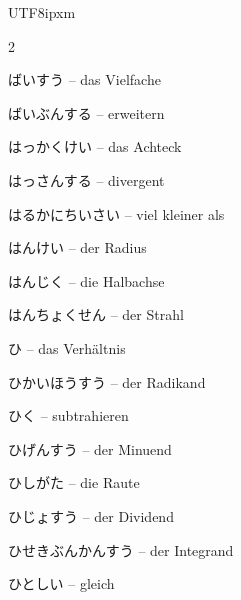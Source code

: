 \begin{CJK}{UTF8}{ipxm}
\begin{multicols}{2}
\par\nopagebreak
{} {\footnotesize\color{black!70}ばいすう} -- das Vielfache\dotfill\hyperref[e:55]{\pageref*{e:55}}\par
{} {\footnotesize\color{black!70}ばいぶんする} -- erweitern\dotfill\hyperref[e:38]{\pageref*{e:38}}\par
{} {\footnotesize\color{black!70}はっかくけい} -- das Achteck\dotfill\hyperref[e:207]{\pageref*{e:207}}\par
{} {\footnotesize\color{black!70}はっさんする} -- divergent\dotfill\hyperref[e:263]{\pageref*{e:263}}\par
{} {\footnotesize\color{black!70}はるかにちいさい} -- viel kleiner als\dotfill\hyperref[e:67]{\pageref*{e:67}}\par
{} {\footnotesize\color{black!70}はんけい} -- der Radius\dotfill\hyperref[e:213]{\pageref*{e:213}}\par
{} {\footnotesize\color{black!70}はんじく} -- die Halbachse\dotfill\hyperref[e:317]{\pageref*{e:317}}\par
{} {\footnotesize\color{black!70}はんちょくせん} -- der Strahl\dotfill\hyperref[e:149]{\pageref*{e:149}}\par
{} {\footnotesize\color{black!70}ひ} -- das Verhältnis\dotfill\hyperref[e:40]{\pageref*{e:40}}\par
{} {\footnotesize\color{black!70}ひかいほうすう} -- der Radikand\dotfill\hyperref[e:48]{\pageref*{e:48}}\par
{} {\footnotesize\color{black!70}ひく} -- subtrahieren\dotfill\hyperref[e:17]{\pageref*{e:17}}\par
{} {\footnotesize\color{black!70}ひげんすう} -- der Minuend\dotfill\hyperref[e:19]{\pageref*{e:19}}\par
{} {\footnotesize\color{black!70}ひしがた} -- die Raute\dotfill\hyperref[e:201]{\pageref*{e:201}}\par
{} {\footnotesize\color{black!70}ひじょすう} -- der Dividend\dotfill\hyperref[e:26]{\pageref*{e:26}}\par
{} {\footnotesize\color{black!70}ひせきぶんかんすう} -- der Integrand\dotfill\hyperref[e:290]{\pageref*{e:290}}\par
{} {\footnotesize\color{black!70}ひとしい} -- gleich\dotfill\hyperref[e:60]{\pageref*{e:60}}\par

\end{multicols}
\end{CJK}
